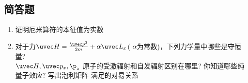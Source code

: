 
\subsection{简答题}
\begin{enumerate}
\item 证明厄米算符的本征值为实数
\item 对于力$\uvec H=\frac{\uvec p^2}{2m}+\alpha \uvec L_x$( $\alpha$为常数)，下列力学量中哪些是守恒量?\\
$\uvec H,\uvec p_x,\p_z$
原子的受激辐射和自发辐射区别在哪里?
你知道哪些纯量子效应?
写出泡利矩阵
满足的对易关系
\end{enumerate}